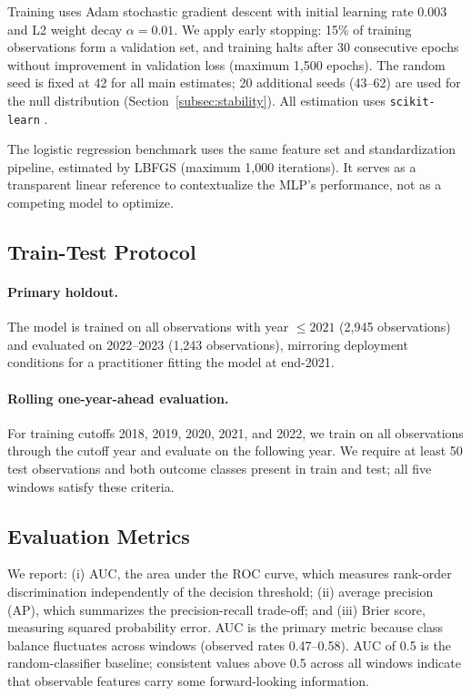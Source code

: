 \documentclass[12pt]{article}
\begin{document}
Training uses Adam stochastic gradient descent with initial learning rate
0.003 and L2 weight decay $\alpha = 0.01$.  We apply early stopping:
15\% of training observations form a validation set, and training halts
after 30 consecutive epochs without improvement in validation loss (maximum
1,500 epochs).  The random seed is fixed at 42 for all main estimates;
20 additional seeds (43--62) are used for the null distribution
(Section~\ref{subsec:stability}).  All estimation uses
\texttt{scikit-learn} \citep{pedregosa2011}.

The logistic regression benchmark uses the same feature set and
standardization pipeline, estimated by LBFGS (maximum 1,000 iterations).
It serves as a transparent linear reference to contextualize the MLP's
performance, not as a competing model to optimize.

\subsection{Train-Test Protocol}

\paragraph{Primary holdout.}
The model is trained on all observations with year $\leq 2021$ (2,945
observations) and evaluated on 2022--2023 (1,243 observations), mirroring
deployment conditions for a practitioner fitting the model at end-2021.

\paragraph{Rolling one-year-ahead evaluation.}
For training cutoffs 2018, 2019, 2020, 2021, and 2022, we train on all
observations through the cutoff year and evaluate on the following year.
We require at least 50 test observations and both outcome classes present
in train and test; all five windows satisfy these criteria.

\subsection{Evaluation Metrics}

We report: (i) AUC, the area under the ROC curve, which measures
rank-order discrimination independently of the decision threshold;
(ii) average precision (AP), which summarizes the precision-recall
trade-off; and (iii) Brier score, measuring squared probability error.
AUC is the primary metric because class balance fluctuates across windows
(observed rates 0.47--0.58).  AUC of 0.5 is the random-classifier
baseline; consistent values above 0.5 across all windows indicate that
observable features carry some forward-looking information.
\end{document}
